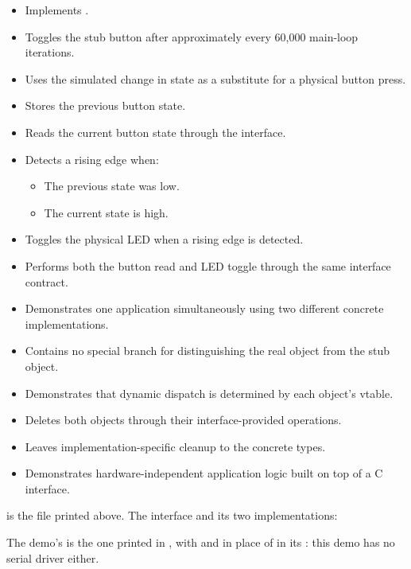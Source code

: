 \begin{itemize}
\begin{itemize}
    \item Implements .
    \item Toggles the stub button after approximately every 60,000 main-loop iterations.
    \item Uses the simulated change in state as a substitute for a physical button press.
    \item Stores the previous button state.
    \item Reads the current button state through the interface.
    \item Detects a rising edge when:
    \begin{itemize}
      \item The previous state was low.
      \item The current state is high.
    \end{itemize}
    \item Toggles the physical LED when a rising edge is detected.
    \item Performs both the button read and LED toggle through the same interface contract.
    \item Demonstrates one application simultaneously using two different concrete
      implementations.
    \item Contains no special branch for distinguishing the real object from the stub object.
    \item Demonstrates that dynamic dispatch is determined by each object's vtable.
    \item Deletes both objects through their interface-provided  operations.
    \item Leaves implementation-specific cleanup to the concrete types.
    \item Demonstrates hardware-independent application logic built on top of a C interface.
  \end{itemize}
\end{itemize}
 is the file printed above. The interface and its two implementations:


\noindent The demo's  is the one printed in , with
 and  in place of
 in its : this demo has no serial driver either.
